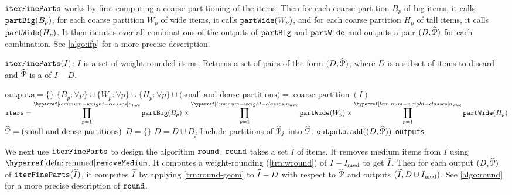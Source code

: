 $\operatorname{\mathtt{iterFineParts}}$ works by first computing a coarse partitioning of the items.
Then for each coarse partition $B_p$ of big items, it calls $\operatorname{\mathtt{partBig}}(B_p)$,
for each coarse partition $W_p$ of wide items, it calls $\operatorname{\mathtt{partWide}}(W_p)$,
and for each coarse partition $H_p$ of tall items, it calls $\operatorname{\mathtt{partWide}}(H_p)$.
It then iterates over all combinations of the outputs of $\operatorname{\mathtt{partBig}}$ and $\operatorname{\mathtt{partWide}}$
and outputs a pair $(D, \widehat{\mathcal{P}})$ for each combination.
See \cref{algo:ifp} for a more precise description.

\begin{algorithm}[htb]
\caption{$\operatorname{\mathtt{iterFineParts}}(I)$: $I$ is a set of weight-rounded items.
Returns a set of pairs of the form $(D, \widehat{\mathcal{P}})$,
where $D$ is a subset of items to discard
and $\widehat{\mathcal{P}}$ is a \finePartHyp{} of $I-D$.}
\label{algo:ifp}
\begin{algorithmic}[1]
\State $\texttt{outputs} = \{\}$
\State $\{B_p: \forall p\} \cup \{W_p: \forall p\} \cup \{H_p: \forall p\}
    \cup \textrm{(small and dense partitions)}
    = \hyperref[obs:coarse-part]{\operatorname{coarse-partition}}(I)$
\State $\texttt{iters} = {\displaystyle \cartProd_{p=1}^{\nbwcHyp} \partBigHyp(B_p)
        \times \cartProd_{p=1}^{\nwwcHyp} \partWideHyp(W_p)
        \times \cartProd_{p=1}^{\nwwcHyp} \partWideHyp(H_p)}$
    \State $\widehat{\mathcal{P}} = \textrm{(small and dense partitions)}$
    \State $D = \{\}$
        \State $D = D \cup D_j$
        \State Include partitions of $\widehat{\mathcal{P}}_j$ into $\widehat{\mathcal{P}}$.
    \EndFor
    \State $\operatorname{\mathtt{outputs.add}}((D, \widehat{\mathcal{P}}))$
\EndFor
\State \Return \texttt{outputs}
\end{algorithmic}
\end{algorithm}

We next use $\operatorname{\mathtt{iterFineParts}}$ to design the algorithm $\operatorname{\mathtt{round}}$.
$\operatorname{\mathtt{round}}$ takes a set $I$ of items. It removes medium items from $I$ using $\remMedHyp$.
It computes a weight-rounding (\cref{trn:wround}) of $I - I_{\mathrm{med}}$ to get $\widehat{I}$.
Then for each output $(D, \widehat{\mathcal{P}})$ of $\operatorname{\mathtt{iterFineParts}}(\widehat{I})$,
it computes $\widetilde{I}$ by applying \cref{trn:round-geom} to $\widehat{I} - D$
with respect to $\widehat{\mathcal{P}}$ and outputs $(\widetilde{I}, D \cup I_{\mathrm{med}})$.
See \cref{algo:round} for a more precise description of $\operatorname{\mathtt{round}}$.

